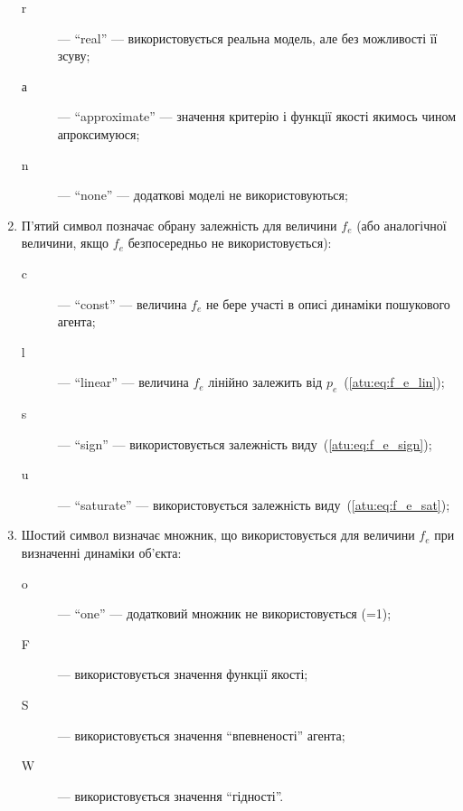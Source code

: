 \begin{enumerate}
\begin{description}
      \item[r] --- ``real'' ---
        використовується реальна модель, але без можливості її зсуву;

      \item[а] --- ``approximate'' ---
        значення критерію і функції якості якимось чином
        апроксимуюся;

      \item[n] --- ``none'' ---
        додаткові моделі не використовуються;

    \end{description}

  \item
    П'ятий символ
    позначає обрану залежність для величини $f_e$ (або
    аналогічної величини, якщо $f_e$ безпосередньо не використовується):
    \begin{description}

      \item[c]  --- ``const'' ---
        величина $f_e $ не бере участі в описі динаміки пошукового агента;

      \item[l] --- ``linear'' ---
        величина $ f_e $ лінійно залежить від $ p_e $~(\ref{atu:eq:f_e_lin});

      \item[s] --- ``sign'' ---
        використовується залежність виду~(\ref{atu:eq:f_e_sign});

      \item[u] --- ``saturate'' ---
        використовується залежність виду~(\ref{atu:eq:f_e_sat});

    \end{description}

  \item
    Шостий символ  визначає множник,
    що використовується для величини $f_e$ при визначенні динаміки об'єкта:
    \begin{description}

      \item[o]  --- ``one'' ---
        додатковий множник не використовується (=1);

      \item[F] ---
        використовується значення функції якості;

      \item[S] ---
        використовується значення ``впевненості'' агента;

      \item[W] ---
        використовується значення ``гідності''.


\end{description}
\end{enumerate}
